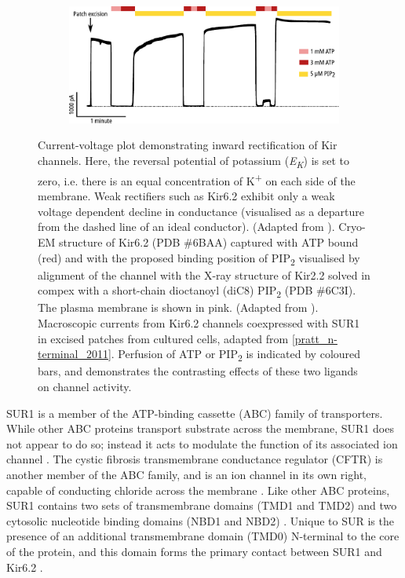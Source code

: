 \begin{figure}[h]
\begin{subfigure}[t]{0.9\textwidth}
		\centering
		\includegraphics[width=\textwidth]{shyng_atp_pip_trace.pdf}
	\end{subfigure}
	\caption[Structure of Kir6.2]{
		 Current-voltage plot demonstrating inward rectification of Kir channels.
		Here, the reversal potential of potassium (\textit{E\textsubscript{K}}) is set to zero, i.e. there is an equal concentration of K\textsuperscript{+} on each side of the membrane.
		Weak rectifiers such as Kir6.2 exhibit only a weak voltage dependent decline in conductance (visualised as a departure from the dashed line of an ideal conductor).
		(Adapted from \cite{zheng_handbook_2015}).
		 Cryo-EM structure of Kir6.2 (PDB \#6BAA) captured with ATP bound (red) and with the proposed binding position of PIP\textsubscript{2} visualised by alignment of the channel with the X-ray structure of Kir2.2 solved in compex with a short-chain dioctanoyl (diC8) PIP\textsubscript{2} (PDB \#6C3I).
		The plasma membrane is shown in pink.
		(Adapted from \cite{puljung_cryo-electron_2018}).
		 Macroscopic currents from Kir6.2 channels coexpressed with SUR1 in excised patches from cultured cells, adapted from \ref{pratt_n-terminal_2011}.
		Perfusion of ATP or PIP\textsubscript{2} is indicated by coloured bars, and demonstrates the contrasting effects of these two ligands on channel activity.
	}
	\label{ch1fig:kir_breakdown}
\end{figure}

SUR1 is a member of the ATP-binding cassette (ABC) family of transporters.
While other ABC proteins transport substrate across the membrane, SUR1 does not appear to do so; instead it acts to modulate the function of its associated ion channel \cite{aguilar-bryan_cloning_1995, tusnady_membrane_1997}.
The cystic fibrosis transmembrane conductance regulator (CFTR) is another member of the ABC family, and is an ion channel in its own right, capable of conducting chloride across the membrane \cite{vergani_cftr_2005}.
Like other ABC proteins, SUR1 contains two sets of transmembrane domains (TMD1 and TMD2) and two cytosolic nucleotide binding domains (NBD1 and NBD2) \cite{aguilar-bryan_cloning_1995, ter_beek_structural_2014}.
Unique to SUR is the presence of an additional transmembrane domain (TMD0) N-terminal to the core of the protein, and this domain forms the primary contact between SUR1 and Kir6.2 \cite{lee_molecular_2017, martin_anti-diabetic_2017-1, li_structure_2017-1, martin_mechanism_2019-1}.

